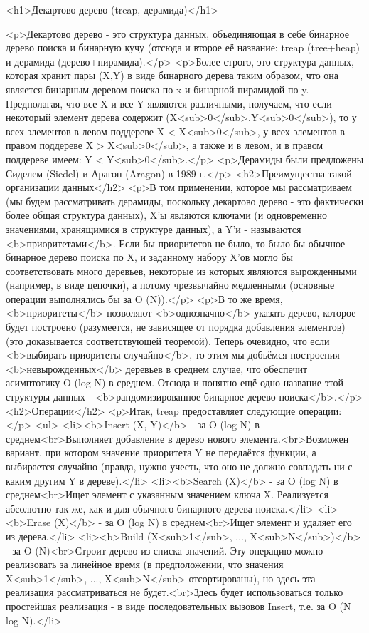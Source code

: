 <h1>Декартово дерево (treap, дерамида)</h1>

<p>Декартово дерево - это структура данных, объединяющая в себе бинарное дерево поиска и бинарную кучу (отсюда и второе её название: treap (tree+heap) и дерамида (дерево+пирамида).</p>
<p>Более строго, это структура данных, которая хранит пары (X,Y) в виде бинарного дерева таким образом, что она является бинарным деревом поиска по x и бинарной пирамидой по y. Предполагая, что все X и все Y являются различными, получаем, что если некоторый элемент дерева содержит (X<sub>0</sub>,Y<sub>0</sub>), то у всех элементов в левом поддереве X < X<sub>0</sub>, у всех элементов в правом поддереве X > X<sub>0</sub>, а также и в левом, и в правом поддереве имеем: Y < Y<sub>0</sub>.</p>
<p>Дерамиды были предложены Сиделем (Siedel) и Арагон (Aragon) в 1989 г.</p>
<h2>Преимущества такой организации данных</h2>
<p>В том применении, которое мы рассматриваем (мы будем рассматривать дерамиды, поскольку декартово дерево - это фактически более общая структура данных), X'ы являются ключами (и одновременно значениями, хранящимися в структуре данных), а Y'и - называются <b>приоритетами</b>. Если бы приоритетов не было, то было бы обычное бинарное дерево поиска по X, и заданному набору X'ов могло бы соответствовать много деревьев, некоторые из которых являются вырожденными (например, в виде цепочки), а потому чрезвычайно медленными (основные операции выполнялись бы за O (N)).</p>
<p>В то же время, <b>приоритеты</b> позволяют <b>однозначно</b> указать дерево, которое будет построено (разумеется, не зависящее от порядка добавления элементов) (это доказывается соответствующей теоремой). Теперь очевидно, что если <b>выбирать приоритеты случайно</b>, то этим мы добьёмся построения <b>невырожденных</b> деревьев в среднем случае, что обеспечит асимптотику O (log N) в среднем. Отсюда и понятно ещё одно название этой структуры данных - <b>рандомизированное бинарное дерево поиска</b>.</p>
<h2>Операции</h2>
<p>Итак, treap предоставляет следующие операции:</p>
<ul>
<li><b>Insert (X, Y)</b> - за O (log N) в среднем<br>Выполняет добавление в дерево нового элемента.<br>Возможен вариант, при котором значение приоритета Y не передаётся функции, а выбирается случайно (правда, нужно учесть, что оно не должно совпадать ни с каким другим Y в дереве).</li>
<li><b>Search (X)</b> - за O (log N) в среднем<br>Ищет элемент с указанным значением ключа X. Реализуется абсолютно так же, как и для обычного бинарного дерева поиска.</li>
<li><b>Erase (X)</b> - за O (log N) в среднем<br>Ищет элемент и удаляет его из дерева.</li>
<li><b>Build (X<sub>1</sub>, ..., X<sub>N</sub>)</b> - за O (N)<br>Строит дерево из списка значений. Эту операцию можно реализовать за линейное время (в предположении, что значения X<sub>1</sub>, ..., X<sub>N</sub> отсортированы), но здесь эта реализация рассматриваться не будет.<br>Здесь будет использоваться только простейшая реализация - в виде последовательных вызовов Insert, т.е. за O (N log N).</li>

